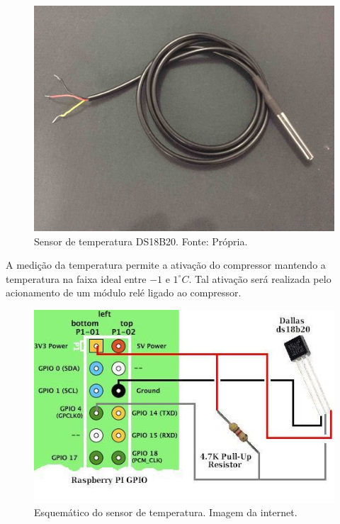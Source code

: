 \begin{figure}[!htb]
            \centering
         	\includegraphics[scale= 0.08]{figuras/temperatura.jpg}
            \caption{Sensor de temperatura DS18B20. Fonte: Própria.}
            \label{sensor-temperatura}
\end{figure}
               
A medição da temperatura permite a ativação do compressor mantendo a temperatura na faixa
ideal entre $-1$ e $1 ^\circ C$. Tal ativação será realizada pelo acionamento de um módulo relé  
ligado ao compressor. 
    
\begin{figure}[!htb]
           \centering
           \includegraphics[scale= 0.5]{figuras/esquema.jpg}
            \caption{Esquemático do sensor de temperatura. Imagem da internet.}
            \label{esquema-temperatura}
\end{figure}    
 

